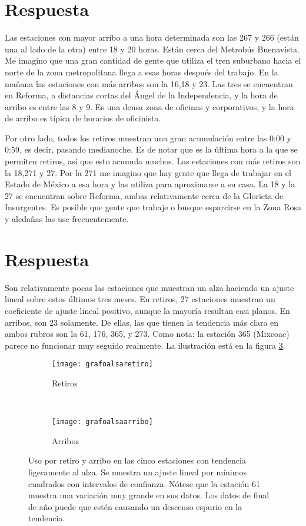 \documentclass{article}
\begin{document}
\section{Respuesta}

Las estaciones con mayor arribo a una hora determinada son las 267 y 266 (están una al lado de la otra) entre 18 y 20 horas. Están cerca del Metrobús Buenavista. Me imagino que una gran cantidad de gente que utiliza el tren suburbano hacia el norte de la zona metropolitana llega a esas horas después del trabajo. En la mañana las estaciones con más arribos son la 16,18 y 23. Las tres se encuentran en Reforma, a distancias cortas del Ángel de la Independencia, y la hora de arribo es entre las 8 y 9. Es una densa zona de oficinas y corporativos, y la hora de arribo es típica de horarios de oficinista.

Por otro lado, todos los retiros muestran una gran acumulación entre las 0:00 y 0:59, es decir, pasando medianoche. Es de notar que es la última hora a la que se permiten retiros, así que esto acumula muchos. Las estaciones con más retiros son la 18,271 y 27. Por la 271 me imagino que hay gente que llega de trabajar en el Estado de México a esa hora y las utiliza para aproximarse a su casa. La 18 y la 27 se encuentran sobre Reforma, ambas relativamente cerca de la Glorieta de Insurgentes. Es posible que gente que trabaje o busque esparcirse en la Zona Rosa y aledañas las use frecuentemente.

\section{Respuesta}

Son relativamente pocas las estaciones que muestran un alza haciendo un ajuste lineal sobre estos últimos tres meses. En retiros, 27 estaciones muestran un coeficiente de ajuste lineal positivo, aunque la mayoría resultan casi planos. En arribos, son 23 solamente.
De ellas, las que tienen la tendencia más clara en ambos rubros son la 61, 176, 365, y 273. Como nota: la estación 365 (Mixcoac) parece no funcionar muy seguido realmente.
La ilustración está en la figura \ref{tenden}.

\begin{figure}[h]
  \centering
    \begin{subfigure}[b]{0.45\textwidth}
        \texttt{[image: grafoalsaretiro]}
        \caption{Retiros}
        \label{figret}
    \end{subfigure}
    ~       
    \begin{subfigure}[b]{0.45\textwidth}
        \texttt{[image: grafoalsaarribo]}
        \caption{Arribos}
        \label{figarr}
    \end{subfigure}
    \caption{Uso por retiro y arribo en las cinco estaciones con tendencia ligeramente al alza. Se muestra un ajuste lineal por mínimos cuadrados con intervalos de confianza. Nótese que la estación 61 muestra una variación muy grande en sus datos. Los datos de final de año puede que estén causando un descenso espurio en la tendencia.}\label{tenden}
\end{figure}
\end{document}

